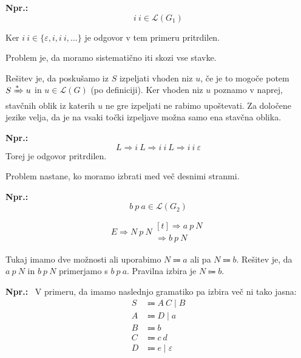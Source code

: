 \documentclass{article}
\newcommand{\Ex}{\textbf{Npr.:}\ }
\newcommand{\Grammar}{G}
\newcommand{\StartSymbol}{S}
\newcommand{\Null}{\varepsilon}
\newcommand{\Language}[1]{\mathcal{L}(#1)}
\newcommand{\Arrow}{\Coloneqq}
\newcommand{\Derive}{\Rightarrow}
\newcommand{\DeriveStar}{\xRightarrow{\ast}}
\newcommand{\Seq}{\ }
\newcommand{\Union}{\mathrel{|}}
\begin{document}
\Ex
  \begin{equation*}
    i \Seq i \in \Language{\Grammar_1}
  \end{equation*}

  Ker $i \Seq i \in \{\Null, i, i \Seq i, \dots\}$ je odgovor v tem primeru pritrdilen.

Problem je, da moramo sistematično iti skozi vse stavke.

Rešitev je, da poskušamo iz $\StartSymbol$ izpeljati vhoden niz $u$, če je to mogoče potem $\StartSymbol \DeriveStar u$ in $u \in \Language{\Grammar}$ (po definiciji).
Ker vhoden niz $u$ poznamo v naprej, stavčnih oblik iz katerih $u$ ne gre izpeljati ne rabimo upoštevati.
Za določene jezike velja, da je na vsaki točki izpeljave možna samo ena stavčna oblika.

\Ex
  \begin{equation*}
    L \Derive i \Seq L \Derive i \Seq i \Seq L \Derive i \Seq i \Seq \Null
  \end{equation*}
  Torej je odgovor pritrdilen.

Problem nastane, ko moramo izbrati med več desnimi stranmi.

\Ex
  \begin{equation*}
    b \Seq p \Seq a \in \Language{\Grammar_2}
  \end{equation*}

  \begin{equation*}
    E \Derive N \Seq p \Seq N \begin{aligned}[t]
      \Derive a \Seq p \Seq N\\
      \Derive b \Seq p \Seq N
    \end{aligned}
  \end{equation*}

Tukaj imamo dve možnosti ali uporabimo $N \Arrow a$ ali pa $N \Arrow b$.
Rešitev je, da $a \Seq p \Seq N$ in $b \Seq p \Seq N$ primerjamo s $b \Seq p \Seq a$.
Pravilna izbira je $N \Arrow b$.

\Ex
V primeru, da imamo naslednjo gramatiko pa izbira več ni tako jasna:
\begin{equation*}
  \tag{$\Grammar_3$}
  \label{g:first}
  \begin{aligned}
    S &\Arrow A \Seq C \Union B \\
    A &\Arrow D \Union a \\
    B &\Arrow b\\
    C &\Arrow c \Seq d\\
    D &\Arrow e \Union \Null
  \end{aligned}
\end{equation*}
\end{document}
